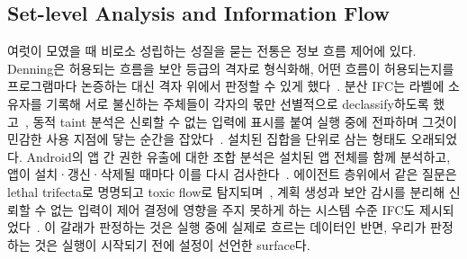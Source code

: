 \documentclass[acmsmall,screen,review,anonymous]{acmart}
\begin{document}
\subsection{Set-level Analysis and Information Flow}
\label{sec:related:setlevel}

여럿이 모였을 때 비로소 성립하는 성질을 묻는 전통은 정보 흐름 제어에 있다. Denning은 허용되는 흐름을 보안 등급의 격자로 형식화해, 어떤 흐름이 허용되는지를 프로그램마다 논증하는 대신 격자 위에서 판정할 수 있게 했다~\cite{denning1976lattice}. 분산 IFC는 라벨에 소유자를 기록해 서로 불신하는 주체들이 각자의 몫만 선별적으로 declassify하도록 했고~\cite{myers1997decentralized}, 동적 taint 분석은 신뢰할 수 없는 입력에 표시를 붙여 실행 중에 전파하며 그것이 민감한 사용 지점에 닿는 순간을 잡았다~\cite{newsome2005dynamic}. 설치된 집합을 단위로 삼는 형태도 오래되었다. Android의 앱 간 권한 유출에 대한 조합 분석은 설치된 앱 전체를 함께 분석하고, 앱이 설치·갱신·삭제될 때마다 이를 다시 검사한다~\cite{bagheri2015covert, li2015iccta}. 에이전트 층위에서 같은 질문은 lethal trifecta로 명명되고 toxic flow로 탐지되며~\cite{willison2025lethal, beurerkellner2025toxicflow, schneider2026securing}, 계획 생성과 보안 감시를 분리해 신뢰할 수 없는 입력이 제어 결정에 영향을 주지 못하게 하는 시스템 수준 IFC도 제시되었다~\cite{wu2024system}. 이 갈래가 판정하는 것은 실행 중에 실제로 흐르는 데이터인 반면, 우리가 판정하는 것은 실행이 시작되기 전에 설정이 선언한 surface다.
\end{document}
